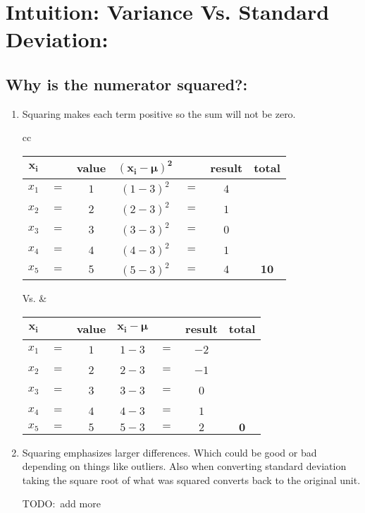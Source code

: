\documentclass[12pt]{article}
\newcommand{\negBi}[3][2]{{(#2- #3)}^{#1}}
\newcommand{\negBiBold}[3][2]{\bm{{(#2- #3)}^{#1}} }
\begin{document}
\section*{Intuition: Variance Vs. Standard Deviation:}

  \subsection*{Why is the numerator squared?:}
\begin{enumerate}
  \item Squaring makes each term positive so the sum will not be zero.
  \begin{table}[h!]
  \begin{center}
  \begin{tabular}{cc}
    \begin{tabular}{ccccccc}
      \toprule
      $\bm{x_{i}}$ & \ & \textbf{value} & $\negBiBold{x_{i}}{\mu}$ &
      \ & \textbf{result} & \textbf{total} \\
      \midrule
      $x_{1}$ & $=$ & $1$ & $\negBi{1}{3}$ & $=$ & $4$ & \ \\
      $x_{2}$ & $=$ & $2$ & $\negBi{2}{3}$ & $=$ & $1$ & \ \\
      $x_{3}$ & $=$ & $3$ & $\negBi{3}{3}$ & $=$ & $0$ & \ \\
      $x_{4}$ & $=$ & $4$ & $\negBi{4}{3}$ & $=$ & $1$ & \ \\
      $x_{5}$ & $=$ & $5$ & $\negBi{5}{3}$ & $=$ & $4$ & $\bm{10}$ \\
      \bottomrule
    \end{tabular} Vs. &
    \begin{tabular}{ccccccc}
      \toprule
      $\bm{x_{i}}$ & \ & \textbf{value} & $\bm{x_{i} - \mu}$ &
      \ & \textbf{result} & \textbf{total}\\
      \midrule
      $x_{1}$ & $=$ & $1$ & $1 - 3$ & $=$ & $-2$ & \ \\
      $x_{2}$ & $=$ & $2$ & $2 - 3$ & $=$ & $-1$ & \ \\
      $x_{3}$ & $=$ & $3$ & $3 - 3$ & $=$ & $0$ & \ \\
      $x_{4}$ & $=$ & $4$ & $4 - 3$ & $=$ & $1$ & \ \\
      $x_{5}$ & $=$ & $5$ & $5 - 3$ & $=$ & $2$ & $\bm{0}$ \\
      \bottomrule
    \end{tabular}
  \end{tabular}
  \label{ComparisonTable}
  \end{center}
  \end{table}
  \item Squaring emphasizes larger differences. Which could be good or bad depending on things like outliers. Also when converting standard deviation taking the square root of what was squared converts back to the original unit.

    TODO:\ add more
\end{enumerate}

\end{document}
